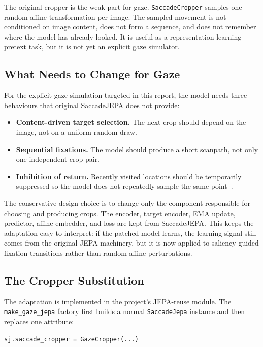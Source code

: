 \documentclass[12pt,a4paper]{article}
\begin{document}
The original cropper is the weak part for gaze. \texttt{SaccadeCropper}
samples one random affine transformation per image. The sampled movement is not
conditioned on image content, does not form a sequence, and does not remember
where the model has already looked. It is useful as a representation-learning
pretext task, but it is not yet an explicit gaze simulator.

\subsection{What Needs to Change for Gaze}
\label{subsec:saccade-reuse}

For the explicit gaze simulation targeted in this report, the model needs three
behaviours that original SaccadeJEPA does not provide:

\begin{itemize}
  \item \textbf{Content-driven target selection.} The next crop should depend
        on the image, not on a uniform random draw.
  \item \textbf{Sequential fixations.} The model should produce a short
        scanpath, not only one independent crop pair.
  \item \textbf{Inhibition of return.} Recently visited locations should be
        temporarily suppressed so the model does not repeatedly sample the same
        point~\cite{klein2000ior}.
\end{itemize}

The conservative design choice is to change only the component responsible for
choosing and producing crops. The encoder, target encoder, EMA update,
predictor, affine embedder, and loss are kept from SaccadeJEPA. This keeps the
adaptation easy to interpret: if the patched model learns, the learning signal
still comes from the original JEPA machinery, but it is now applied to
saliency-guided fixation transitions rather than random affine perturbations.

\subsection{The Cropper Substitution}
\label{subsec:loop:method}

The adaptation is implemented in the project's JEPA-reuse module. The
\texttt{make\_gaze\_jepa} factory first builds a normal \texttt{SaccadeJepa}
instance and then replaces one attribute:

\begin{center}
\texttt{sj.saccade\_cropper = GazeCropper(...)}
\end{center}
\end{document}
